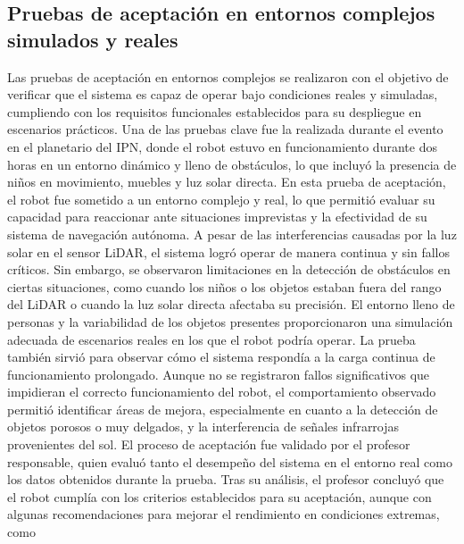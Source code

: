 \subsection{Pruebas de aceptaci\'on en entornos complejos simulados y reales}
    Las pruebas de aceptaci\'on en entornos complejos se realizaron con el objetivo de verificar 
        que el sistema es capaz de operar bajo condiciones reales y simuladas, cumpliendo con 
        los requisitos funcionales establecidos para su despliegue en escenarios pr\'acticos. Una 
        de las pruebas clave fue la realizada durante el evento en el planetario del IPN, donde el 
        robot estuvo en funcionamiento durante dos horas en un entorno din\'amico y lleno de obst\'aculos, 
        lo que incluy\'o la presencia de ni\~nos en movimiento, muebles y luz solar directa.
    \vskip 0.5cm
    En esta prueba de aceptaci\'on, el robot fue sometido a un entorno complejo y real, lo que permiti\'o evaluar 
        su capacidad para reaccionar ante situaciones imprevistas y la efectividad de su sistema de navegaci\'on 
        aut\'onoma. A pesar de las interferencias causadas por la luz solar en el sensor LiDAR, el sistema logr\'o 
        operar de manera continua y sin fallos cr\'iticos. Sin embargo, se observaron limitaciones en la detecci\'on 
        de obst\'aculos en ciertas situaciones, como cuando los ni\~nos o los objetos estaban fuera del rango del 
        LiDAR o cuando la luz solar directa afectaba su precisi\'on.
    \vskip 0.5cm
    El entorno lleno de personas y la variabilidad de los objetos presentes proporcionaron una simulaci\'on adecuada 
        de escenarios reales en los que el robot podr\'ia operar. La prueba tambi\'en sirvi\'o para observar c\'omo el 
        sistema respond\'ia a la carga continua de funcionamiento prolongado. Aunque no se registraron fallos 
        significativos que impidieran el correcto funcionamiento del robot, el comportamiento observado 
        permiti\'o identificar \'areas de mejora, especialmente en cuanto a la detecci\'on de objetos porosos o 
        muy delgados, y la interferencia de se\~nales infrarrojas provenientes del sol.
    \vskip 0.5cm
    El proceso de aceptaci\'on fue validado por el profesor responsable, quien evalu\'o tanto el desempe\~no 
        del sistema en el entorno real como los datos obtenidos durante la prueba. Tras su an\'alisis, 
        el profesor concluy\'o que el robot cumpl\'ia con los criterios establecidos para su aceptaci\'on, 
        aunque con algunas recomendaciones para mejorar el rendimiento en condiciones extremas, como 
